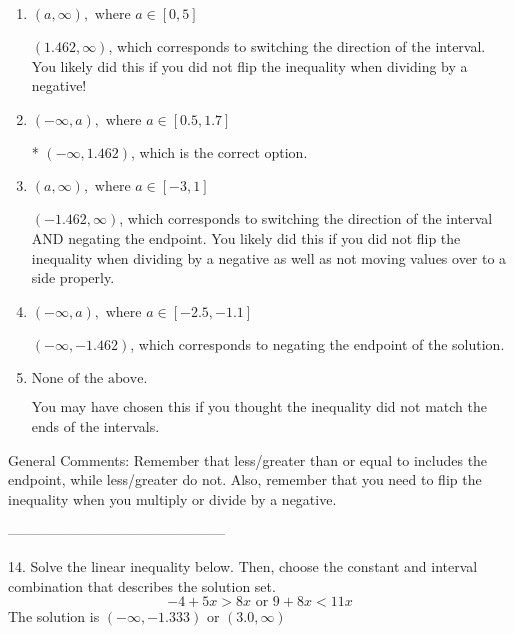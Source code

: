 \documentclass{extbook}[14pt]
\begin{document}
\begin{enumerate}[label=\Alph*.] 
\item $ (a, \infty), \text{ where } a \in [0, 5] $ 

  $(1.462, \infty)$, which corresponds to switching the direction of the interval. You likely did this if you did not flip the inequality when dividing by a negative! 
\item $ (-\infty, a), \text{ where } a \in [0.5, 1.7] $ 

 * $(-\infty, 1.462)$, which is the correct option. 
\item $ (a, \infty), \text{ where } a \in [-3, 1] $ 

  $(-1.462, \infty)$, which corresponds to switching the direction of the interval AND negating the endpoint. You likely did this if you did not flip the inequality when dividing by a negative as well as not moving values over to a side properly. 
\item $ (-\infty, a), \text{ where } a \in [-2.5, -1.1] $ 

  $(-\infty, -1.462)$, which corresponds to negating the endpoint of the solution. 
\item $ \text{None of the above}. $ 

 You may have chosen this if you thought the inequality did not match the ends of the intervals. 
\end{enumerate} 
 
General Comments: Remember that less/greater than or equal to includes the endpoint, while less/greater do not. Also, remember that you need to flip the inequality when you multiply or divide by a negative.

-----------------------------------------------

14. Solve the linear inequality below. Then, choose the constant and interval combination that describes the solution set.
\[ -4 + 5 x > 8 x \text{ or } 9 + 8 x < 11 x \] 
The solution is $ (-\infty, -1.333) \text{ or } (3.0, \infty) $ 
\end{document}
